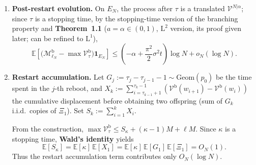 
\small
\begin{enumerate}
\item \textbf{Post-restart evolution.}
  On $E_N$, the process after $\tau$ is a translated $\mathcal{V}^{N|\alpha}$;
  since $\tau$ is a stopping time, by the stopping-time version of the branching property
  and \textbf{Theorem~1.1} ($a=\alpha\in(0,1)$, $\mathrm L^2$ version, its proof
  given later; can be refined to $\mathrm L^1$),
  \[
      \mathbb{E}\!\left[
          \bigl(\mathcal{M}_{\ell_N}^{\mathrm{b}}-\max\mathcal{V}^{\mathrm{b}}_\tau\bigr)\mathbf{1}_{E_N}
      \right]
      \le
      \left(-\alpha+\frac{\pi^2}{2}\sigma^2 t\right)\log N+o_N(\log N).
  \]

\item \textbf{Restart accumulation.}
  Let $G_j:=\tau_j-\tau_{j-1}-1\sim\mathrm{Geom}(p_0)$ be the time spent in the $j$-th reboot,
  and $X_k:=\sum_{i=\tau_{k-1}+1}^{\tau_k-1}(\mathcal{V}^{\mathrm b}(w_{i+1})-\mathcal{V}^{\mathrm b}(w_i))$
  the cumulative displacement before obtaining two offspring
  (sum of $G_k$ i.i.d.\ copies of $\Xi_1$). Set $S_k:=\sum_{i=1}^k X_i$.

  From the construction, $\max\mathcal{V}^{\mathrm{b}}_\tau\le S_\kappa+(\kappa-1)M+\ell M$.
  Since $\kappa$ is a stopping time, \textbf{Wald's identity} yields
  \[
      \mathbb{E}[S_\kappa]=\mathbb{E}[\kappa]\,\mathbb{E}[X_1]
      =\mathbb{E}[\kappa]\,\mathbb{E}[G_1]\,\mathbb{E}[\Xi_1]=O_N(1).
  \]
  Thus the restart accumulation term contributes only $O_N(\log N)$.
\end{enumerate}
